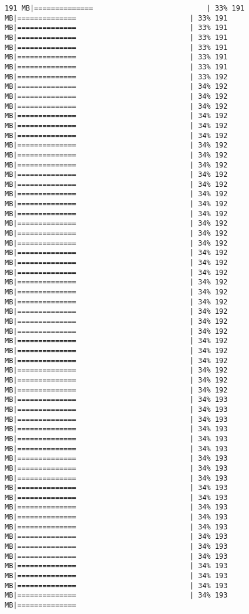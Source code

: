 \documentclass[
]{article}
\begin{document}
\begin{verbatim}
191 MB|==============                           | 33% 191 MB|==============                           | 33% 191 MB|==============                           | 33% 191 MB|==============                           | 33% 191 MB|==============                           | 33% 191 MB|==============                           | 33% 191 MB|==============                           | 33% 191 MB|==============                           | 33% 192 MB|==============                           | 34% 192 MB|==============                           | 34% 192 MB|==============                           | 34% 192 MB|==============                           | 34% 192 MB|==============                           | 34% 192 MB|==============                           | 34% 192 MB|==============                           | 34% 192 MB|==============                           | 34% 192 MB|==============                           | 34% 192 MB|==============                           | 34% 192 MB|==============                           | 34% 192 MB|==============                           | 34% 192 MB|==============                           | 34% 192 MB|==============                           | 34% 192 MB|==============                           | 34% 192 MB|==============                           | 34% 192 MB|==============                           | 34% 192 MB|==============                           | 34% 192 MB|==============                           | 34% 192 MB|==============                           | 34% 192 MB|==============                           | 34% 192 MB|==============                           | 34% 192 MB|==============                           | 34% 192 MB|==============                           | 34% 192 MB|==============                           | 34% 192 MB|==============                           | 34% 192 MB|==============                           | 34% 192 MB|==============                           | 34% 192 MB|==============                           | 34% 192 MB|==============                           | 34% 192 MB|==============                           | 34% 192 MB|==============                           | 34% 192 MB|==============                           | 34% 193 MB|==============                           | 34% 193 MB|==============                           | 34% 193 MB|==============                           | 34% 193 MB|==============                           | 34% 193 MB|==============                           | 34% 193 MB|==============                           | 34% 193 MB|==============                           | 34% 193 MB|==============                           | 34% 193 MB|==============                           | 34% 193 MB|==============                           | 34% 193 MB|==============                           | 34% 193 MB|==============                           | 34% 193 MB|==============                           | 34% 193 MB|==============                           | 34% 193 MB|==============                           | 34% 193 MB|==============                           | 34% 193 MB|==============                           | 34% 193 MB|==============                           | 34% 193 MB|==============                           | 34% 193 MB|==============                           | 34% 193 MB|==============    
\end{verbatim}
\end{document}
